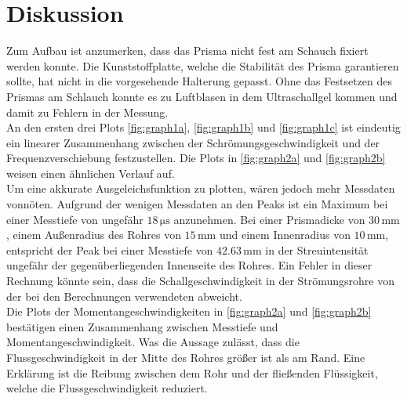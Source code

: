 \section{Diskussion}
\label{sec:diskussion}

Zum Aufbau ist anzumerken, dass das Prisma nicht fest am Schauch fixiert werden konnte. Die Kunststoffplatte, welche die Stabilität des Prisma garantieren sollte, hat nicht in die vorgesehende Halterung gepasst.
Ohne das Festsetzen des Prismas am Schlauch konnte es zu Luftblasen in dem Ultraschallgel kommen und damit zu Fehlern in der Messung. \\

An den ersten drei Plots \autoref{fig:graph1a}, \autoref{fig:graph1b} und \autoref{fig:graph1c} ist eindeutig ein linearer Zusammenhang zwischen der Schrömungsgeschwindigkeit und der Frequenzverschiebung festzustellen.
Die Plots in \autoref{fig:graph2a} und \autoref{fig:graph2b} weisen einen ähnlichen Verlauf auf. \\
Um eine akkurate Ausgeleichsfunktion zu plotten, wären jedoch mehr Messdaten vonnöten. 
Aufgrund der wenigen Messdaten an den Peaks ist ein Maximum bei einer Messtiefe von ungefähr $18  \, \unit{\micro\second}$ anzunehmen. 
Bei einer Prismadicke von $30 \, \unit{\milli\meter} $, einem Außenradius des Rohres von $15 \, \unit{\milli\meter} $ und einem Innenradius von $10 \, \unit{\milli\meter}  $, entspricht der Peak bei einer Messtiefe von  $42.63 \, \unit{\milli\meter} $ in der Streuintensität ungefähr der gegenüberliegenden Innenseite des Rohres.
Ein Fehler in dieser Rechnung könnte sein, dass die Schallgeschwindigkeit in der Strömungsrohre von der bei den Berechnungen verwendeten abweicht.\\

Die Plots der Momentangeschwindigkeiten in \autoref{fig:graph2a} und \autoref{fig:graph2b} bestätigen einen Zusammenhang zwischen Messtiefe und Momentangeschwindigkeit.
Was die Aussage zulässt, dass die Flussgeschwindigkeit in der Mitte des Rohres größer ist als am Rand.
Eine Erklärung ist die Reibung zwischen dem Rohr und der fließenden Flüssigkeit, welche die Flussgeschwindigkeit reduziert.



